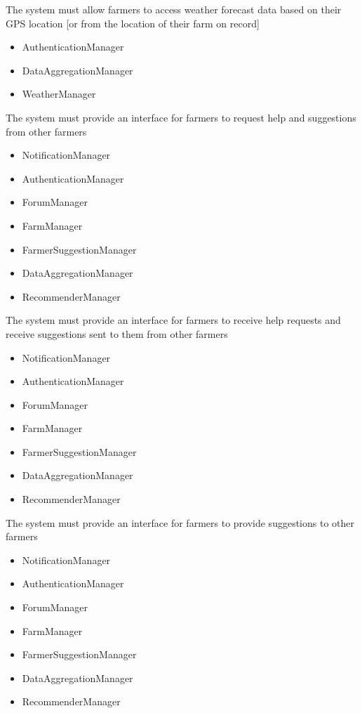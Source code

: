 \begin{itemize}
\begin{itemize}
\end{itemize}

 The system must allow farmers to access weather forecast data based on their GPS location [or from the location of their farm on record]

\begin{itemize}

\item AuthenticationManager
\item DataAggregationManager
\item WeatherManager

\end{itemize}

 The system must provide an interface for farmers to request help and suggestions from other farmers
\begin{itemize}

\item NotificationManager
\item AuthenticationManager
\item ForumManager
\item FarmManager
\item FarmerSuggestionManager
\item DataAggregationManager
\item RecommenderManager

\end{itemize}
 The system must provide an interface for farmers to receive help requests and receive suggestions sent to them from other farmers
\begin{itemize}

\item NotificationManager
\item AuthenticationManager
\item ForumManager
\item FarmManager
\item FarmerSuggestionManager
\item DataAggregationManager
\item RecommenderManager


\end{itemize}
 The system must provide an interface for farmers to provide suggestions to other farmers
\begin{itemize}

\item NotificationManager
\item AuthenticationManager
\item ForumManager
\item FarmManager
\item FarmerSuggestionManager
\item DataAggregationManager
\item RecommenderManager



\end{itemize}
\end{itemize}

